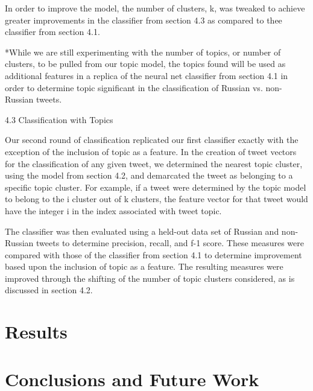 \documentclass[11pt,a4paper]{article}
\begin{document}
In order to improve the model, the number of clusters, k, was tweaked to achieve greater improvements in the classifier from section 4.3 as compared to thee classifier from section 4.1. 

*While we are still experimenting with the number of topics, or number of clusters, to be pulled from our topic model, the topics found will be used as additional features in a replica of the neural net classifier from section 4.1 in order to determine topic significant in the classification of Russian vs. non-Russian tweets. 

4.3 Classification with Topics

Our second round of classification replicated our first classifier exactly with the exception of the inclusion of topic as a feature. In the creation of tweet vectors for the classification of any given tweet, we determined the nearest topic cluster, using the model from section 4.2, and demarcated the tweet as belonging to a specific topic cluster. For example, if a tweet were determined by the topic model to belong to the i cluster out of k clusters, the feature vector for that tweet would have the integer i in the index associated with tweet topic. 

The classifier was then evaluated using a held-out data set of Russian and non-Russian tweets to determine precision, recall, and f-1 score. These measures were compared with those of the classifier from section 4.1 to determine improvement based upon the inclusion of topic as a feature. The resulting measures were improved through the shifting of the number of topic clusters considered, as is discussed in section 4.2. \cite{Aho:72}

\section{Results}

\section{Conclusions and Future Work}





\cite{Aho:72}

\end{document}
